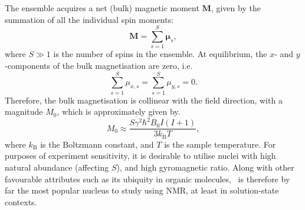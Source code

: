 The ensemble acquires a net (bulk) magnetic moment $\symbf{M}$, given by the
summation of all the individual spin moments:
\begin{equation}
    \symbf{M} = \sum\limits_{s=1}^{S} \symbf{\mu}_s,
\end{equation}
where $S \gg 1$ is the number of spins in the ensemble.
At equilibrium, the $x$- and $y$-components of the bulk magnetisation are zero,
i.e.
\begin{equation}
    \sum_{s=1}^{S} \mu_{x,s} = \sum_{s=1}^{S} \mu_{y,s} = 0.
\end{equation}
Therefore, the bulk magnetisation is collinear with the field direction, with a
magnitude $M_0$, which is approximately given by\cite[Section 1.1]{Cavanagh2007}.
\begin{equation}
    M_0 \approx \frac{S \gamma^2 \hbar^2 B_0 I (I + 1)}{3 k_{\text{B}} T},
\end{equation}
where $k_{\text{B}}$ is the Boltzmann constant, and $T$ is the sample
temperature. For purposes of experiment sensitivity, it is desirable to
utilise nuclei with high natural abundance (affecting $S$), and high
gyromagnetic ratio. Along with other favourable attributes such as its ubiquity
in organic molecules, \proton\ is therefore by far the most popular nucleus to
study using \ac{NMR}, at least in solution-state contexts.

